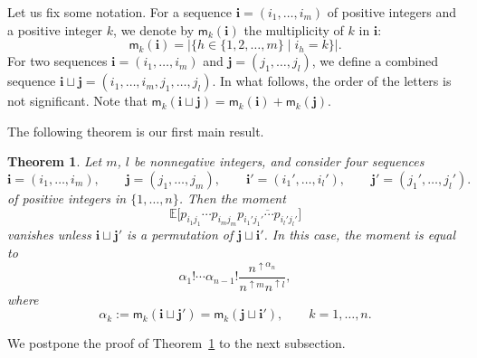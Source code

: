 \documentclass[10pt,a4paper]{amsart}
\numberwithin{equation}{section}
\newtheorem{Theorem}{Theorem}[section]
\theoremstyle{definition}
\newcommand{\mult}{\mathsf{m}}
\begin{document}
Let us fix some notation.
For a sequence $\bm{i}=(i_1,\dots, i_m)$ of positive integers and a positive integer $k$,
we denote by $\mult_k(\bm{i})$ the multiplicity of $k$ in $\bm{i}$:
\[
\mult_k (\bm{i})= |\{h \in \{1,2,\dots, m\} \mid i_h=k\}|.
\]
For two sequences
$\bm{i}=(i_1,\dots, i_m)$ and $\bm{j}=(j_1,\dots, j_l)$,
we define a combined sequence
$\bm{i} \sqcup \bm{j} = (i_1,\dots, i_m, j_1,\dots,j_l)$.
In what follows, the order of the letters is not significant.
Note that $\mult_k(\bm{i} \sqcup \bm{j})= \mult_k(\bm{i})+ \mult_k(\bm{j})$.

The following theorem is our first main result.

\begin{Theorem} \label{thm:momentsP}
Let $m$, $l$ be nonnegative integers, and consider four sequences
\[
\bm{i}=(i_1,\dots, i_m), \qquad \bm{j} =(j_1,\dots, j_m), \qquad
\bm{i}'=(i_1',\dots, i_l'), \qquad \bm{j}' =(j_1',\dots, j_l').
\]
of positive integers in $\{1,\dots, n\}$.
Then the moment
\[
\mathbb{E} \bigl[ p_{i_1 j_1} \cdots p_{i_m j_m} \overline{p_{i_1' j_1'} \cdots p_{i_l' j_l'}} \bigr]
\]
vanishes unless $\bm{i} \sqcup \bm{j}'$ is a permutation of $\bm{j} \sqcup \bm{i}'$.
In this case, the moment is equal to
\[
\alpha_1! \cdots \alpha_{n-1}! \frac{n^{\uparrow \alpha_n}}{n^{\uparrow m}n^{\uparrow l}},
\]
where
\[
\alpha_k := \mult_{k}(\bm{i}\sqcup \bm{j}') = \mult_{k}(\bm{j} \sqcup \bm{i}'),
\qquad k=1,\dots,n.
\]
\end{Theorem}

We postpone the proof of Theorem~\ref{thm:momentsP} to the next subsection.
\end{document}

